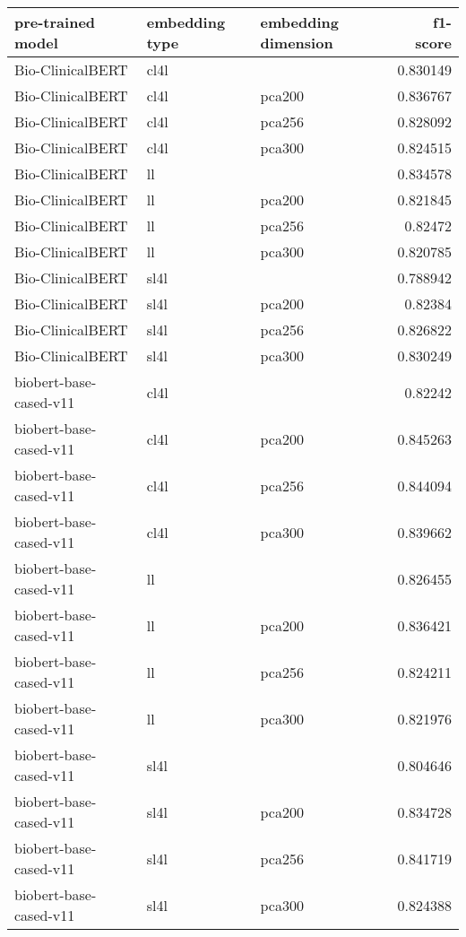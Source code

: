 \begin{tabular}{lllr}
\hline
 pre-trained model      & embedding type   & embedding dimension   &   f1-score \\
\hline
 Bio-ClinicalBERT       & cl4l             &                       &   0.830149 \\
 Bio-ClinicalBERT       & cl4l             & pca200                &   0.836767 \\
 Bio-ClinicalBERT       & cl4l             & pca256                &   0.828092 \\
 Bio-ClinicalBERT       & cl4l             & pca300                &   0.824515 \\
 Bio-ClinicalBERT       & ll               &                       &   0.834578 \\
 Bio-ClinicalBERT       & ll               & pca200                &   0.821845 \\
 Bio-ClinicalBERT       & ll               & pca256                &   0.82472  \\
 Bio-ClinicalBERT       & ll               & pca300                &   0.820785 \\
 Bio-ClinicalBERT       & sl4l             &                       &   0.788942 \\
 Bio-ClinicalBERT       & sl4l             & pca200                &   0.82384  \\
 Bio-ClinicalBERT       & sl4l             & pca256                &   0.826822 \\
 Bio-ClinicalBERT       & sl4l             & pca300                &   0.830249 \\
 biobert-base-cased-v11 & cl4l             &                       &   0.82242  \\
 biobert-base-cased-v11 & cl4l             & pca200                &   0.845263 \\
 biobert-base-cased-v11 & cl4l             & pca256                &   0.844094 \\
 biobert-base-cased-v11 & cl4l             & pca300                &   0.839662 \\
 biobert-base-cased-v11 & ll               &                       &   0.826455 \\
 biobert-base-cased-v11 & ll               & pca200                &   0.836421 \\
 biobert-base-cased-v11 & ll               & pca256                &   0.824211 \\
 biobert-base-cased-v11 & ll               & pca300                &   0.821976 \\
 biobert-base-cased-v11 & sl4l             &                       &   0.804646 \\
 biobert-base-cased-v11 & sl4l             & pca200                &   0.834728 \\
 biobert-base-cased-v11 & sl4l             & pca256                &   0.841719 \\
 biobert-base-cased-v11 & sl4l             & pca300                &   0.824388 \\
\hline
\end{tabular}